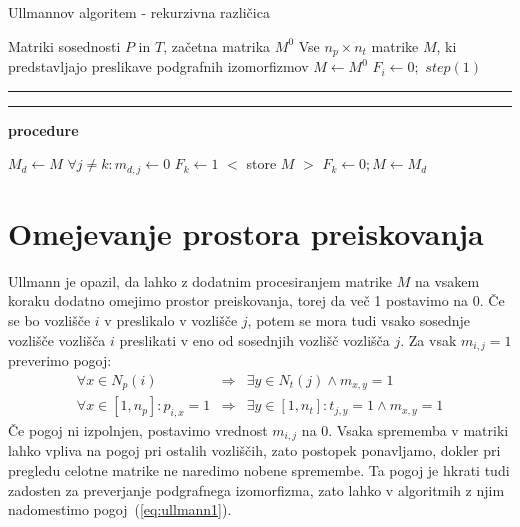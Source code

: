 \documentclass[a4paper, 12pt, ]{book}
\newcommand\Subalg[1]{%
	\Statex%
	\vspace*{-.7\baselineskip}%
	\hspace*{\dimexpr-\algorithmicindent-4pt\relax}%
	\rule{\textwidth}{0.4pt}%
	\Statex%
	
	\vspace*{-.7\baselineskip}%
	\Statex\hspace*{\dimexpr-\algorithmicindent-2pt\relax}%
	\rule{\textwidth}{0.4pt}%
	
	\Statex\hspace*{-\algorithmicindent}\textbf{procedure} #1%
}
\begin{document}
\begin{algorithm}
\caption{Ullmannov algoritem - rekurzivna različica}
\label{alg:ullmann3}
\begin{algorithmic}[1]
	\Require Matriki sosednosti $P$ in $T$, začetna matrika $M^0$
	\Ensure Vse $n_p \times n_t$ matrike $M$, ki predstavljajo preslikave podgrafnih izomorfizmov				
	\State $M \gets M^0$
	 $F_i \gets 0;$ \EndFor
	\State $step(1)$
	\Subalg{}
			\State \Return
		\EndIf
		\State $M_d \gets M$
				\State $\forall j \not = k : m_{d,j} \gets 0$
				\State $F_k \gets 1$
						\State $<$ store $M$ $>$
					\EndIf
				\Else
					\State {}
				\EndIf
				\State $F_k \gets 0; M \gets M_d$
			\EndIf
		\EndFor
\end{algorithmic}
\end{algorithm}


	\section{Omejevanje prostora preiskovanja}
	Ullmann je opazil, da lahko z dodatnim procesiranjem matrike $M$ na vsakem koraku dodatno omejimo prostor preiskovanja, torej da več 1 postavimo
	na 0. Če se bo vozlišče $i$ v preslikalo v vozlišče $j$, potem se mora tudi vsako sosednje vozlišče vozlišča $i$ preslikati v eno od 
	sosednjih vozlišč vozlišča $j$. Za vsak $m_{i,j} = 1$ preverimo pogoj:
	\begin{equation}
	\label{eq:ullmann3}
	\begin{array}{rcl}
	\forall x \in N_{p}(i) & \Rightarrow & \exists y \in N_t(j) \wedge m_{x,y} = 1
	\\
	\forall x \in [1, n_p] : p_{i,x} = 1 & \Rightarrow & \exists y \in [1, n_t] : t_{j,y} = 1 \wedge m_{x,y} = 1
	\end{array}
	\end{equation}
	Če pogoj ni izpolnjen, postavimo vrednost $m_{i,j}$ na 0. Vsaka sprememba v matriki lahko vpliva na pogoj pri ostalih vozliščih, zato postopek
	ponavljamo, dokler pri pregledu celotne matrike ne naredimo nobene spremembe. Ta pogoj je hkrati tudi zadosten za preverjanje podgrafnega 
	izomorfizma, zato lahko v algoritmih z njim nadomestimo pogoj~(\ref{eq:ullmann1}).
	
\end{document}
